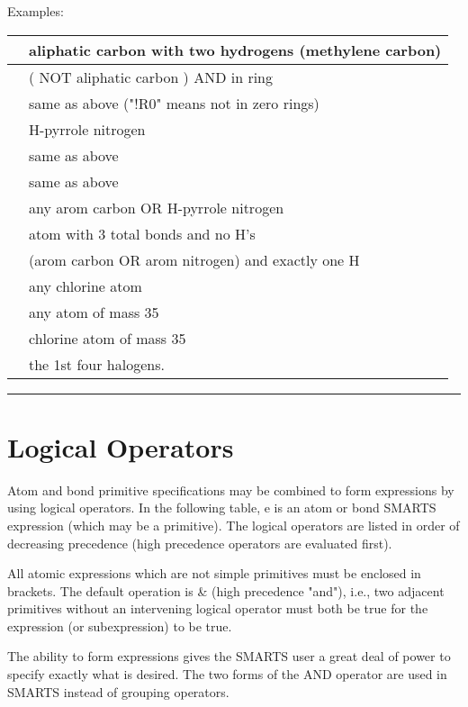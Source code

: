 \begin{itemize}
Examples: \par
\begin{tabular}{| l | l |}
\hline
  [CH2] & aliphatic carbon with two hydrogens (methylene carbon) \\ \hline
  [!C;R] & ( NOT aliphatic carbon ) AND in ring \\ \hline
  [!C;!R0] & same as above ("!R0" means not in zero rings) \\ \hline
  [n;H1] & H-pyrrole nitrogen \\ \hline
  [n\&H1] & same as above \\ \hline
  [nH1] & same as above \\ \hline
  [c,n\&H1] & any arom carbon OR H-pyrrole nitrogen \\ \hline
  [X3\&H0] & atom with 3 total bonds and no H's \\ \hline
  [c,n;H1] & (arom carbon OR arom nitrogen)  and exactly one H \\ \hline
  [Cl] & any chlorine atom \\ \hline
  [35*] & any atom of mass 35 \\ \hline
  [35Cl] & chlorine atom of mass 35 \\ \hline
  [F,Cl,Br,I] & the 1st four halogens. \\ \hline
\end{tabular}

\rule{6in}{0.01cm}\par
{}\par
\section{Logical Operators}

 Atom and bond primitive specifications may be combined to form expressions by using logical operators. In the following table, e is an atom or bond SMARTS expression (which may be a primitive). The logical operators are listed in order of decreasing precedence (high precedence operators are evaluated first).

All atomic expressions which are not simple primitives must be enclosed in brackets. The default operation is \& (high precedence "and"), i.e., two adjacent primitives without an intervening logical operator must both be true for the expression (or subexpression) to be true.

The ability to form expressions gives the SMARTS user a great deal of power to specify exactly what is desired. The two forms of the AND operator are used in SMARTS instead of grouping operators.


\end{itemize}
